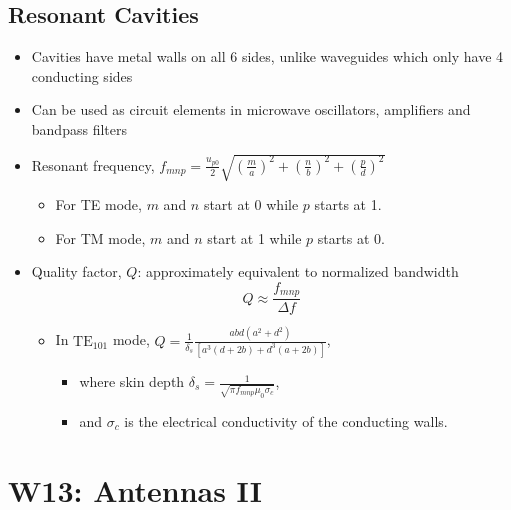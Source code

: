 \documentclass[a4paper]{article}
\begin{document}
\subsection{Resonant Cavities}
\begin{itemize}
    \item Cavities have metal walls on all 6 sides, unlike waveguides which only have 4 conducting sides
    \item Can be used as circuit elements in microwave oscillators, amplifiers and bandpass filters
    \item Resonant frequency, $f_{mnp} = \displaystyle\frac{u_{p0}}{2}\sqrt{\left(\displaystyle\frac{m}{a}\right)^2+\left(\displaystyle\frac{n}{b}\right)^2+\left(\displaystyle\frac{p}{d}\right)^2}$
    \begin{itemize}[label=$\circ$]
        \item For TE mode, $m$ and $n$ start at 0 while $p$ starts at 1.
        \item For TM mode, $m$ and $n$ start at 1 while $p$ starts at 0.
    \end{itemize}
    \item Quality factor, $Q$: approximately equivalent to normalized bandwidth
    $$Q \approx \frac{f_{mnp}}{\Delta f}$$
    \begin{itemize}[label=$\circ$]
        \item In $\text{TE}_{101}$ mode, $Q = \displaystyle\frac{1}{\delta_s}\displaystyle\frac{abd(a^2+d^2)}{[a^3(d+2b)+d^3(a+2b)]}$,
        \begin{itemize}[label=\tiny$\blacksquare$]
            \item where skin depth $\delta_s = \displaystyle\frac{1}{\sqrt{\pi f_{mnp}\mu_0\sigma_c}}$,
            \item and $\sigma_c$ is the electrical conductivity of the conducting walls.
        \end{itemize}
    \end{itemize}
\end{itemize}

\newpage
\section{W13: Antennas II}
\end{document}
